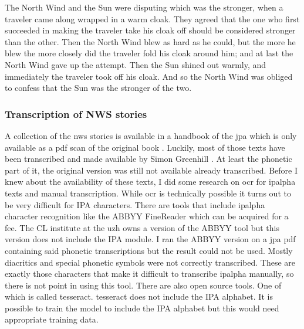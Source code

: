 \begin{covexamples}
\item \label{ex:nws-story-ortho} The North Wind and the Sun were disputing which was the stronger, when a traveler came along wrapped in a warm cloak. They agreed that the one who first succeeded in making the traveler take his cloak off should be considered stronger than the other. Then the North Wind blew as hard as he could, but the more he blew the more closely did the traveler fold his cloak around him; and at last the North Wind gave up the attempt. Then the Sun shined out warmly, and immediately the traveler took off his cloak. And so the North Wind was obliged to confess that the Sun was the stronger of the two.
\item \label{ex:nws-story-phon} 
\end{covexamples}

\subsubsection*{Transcription of NWS stories}
A collection of the \ac{nws} stories is available in a handbook of the \ac{jpa} which is only available as a pdf scan of the original book \citep{JIPA2010}. Luckily, most of those texts have been transcribed and made available by Simon Greenhill \citep{GitHub.04.02.2022}. At least the phonetic part of it, the original version was still not available already transcribed. Before I knew about the availability of these texts, I did some research on \ac{ocr} for \ac{ipalpha} texts and manual transcription. While \ac{ocr} is technically possible it turns out to be very difficult for IPA characters. There are tools that include \ac{ipalpha} character recognition like the ABBYY FineReader which can be acquired for a fee. The CL institute at the \ac{uzh} owns a version of the ABBYY tool but this version does not include the IPA module. I ran the ABBYY version on a \ac{jpa} pdf containing said phonetic transcriptions but the result could not be used. Mostly diacritics and special phonetic symbols were not correctly transcribed. These are exactly those characters that make it difficult to transcribe \ac{ipalpha} manually, so there is not point in using this tool. There are also open source tools. One of which is called tesseract. tesseract does not include the IPA alphabet. It is possible to train the model to include the IPA alphabet but this would need appropriate training data.

